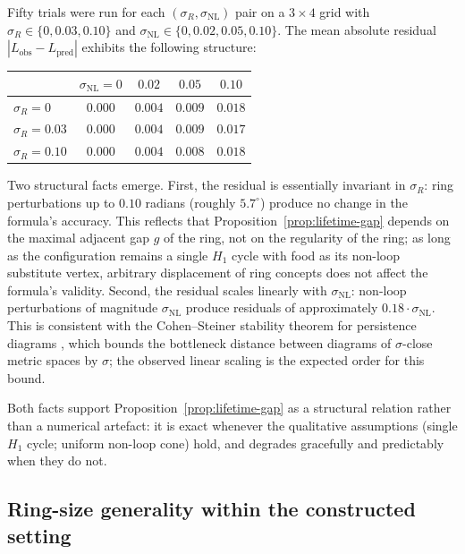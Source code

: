 \documentclass[12pt]{article}
\begin{document}
Fifty trials were run for each $(\sigma_R, \sigma_\mathrm{NL})$
pair on a $3 \times 4$ grid with $\sigma_R \in \{0, 0.03, 0.10\}$
and $\sigma_\mathrm{NL} \in \{0, 0.02, 0.05, 0.10\}$. The mean
absolute residual $|L_\mathrm{obs} - L_\mathrm{pred}|$ exhibits
the following structure:

\begin{center}
\begin{tabular}{l|cccc}
\hline
 & $\sigma_\mathrm{NL} = 0$ & $0.02$ & $0.05$ & $0.10$ \\
\hline
$\sigma_R = 0$    & $0.000$ & $0.004$ & $0.009$ & $0.018$ \\
$\sigma_R = 0.03$ & $0.000$ & $0.004$ & $0.009$ & $0.017$ \\
$\sigma_R = 0.10$ & $0.000$ & $0.004$ & $0.008$ & $0.018$ \\
\hline
\end{tabular}
\end{center}

Two structural facts emerge. First, the residual is essentially
invariant in $\sigma_R$: ring perturbations up to $0.10$ radians
(roughly $5.7^{\circ}$) produce no change in the formula's
accuracy. This reflects that
Proposition~\ref{prop:lifetime-gap} depends on the maximal adjacent
gap $g$ of the ring, not on the regularity of the ring; as long as
the configuration remains a single $H_1$ cycle with food as its
non-loop substitute vertex, arbitrary displacement of ring
concepts does not affect the formula's validity. Second, the
residual scales linearly with $\sigma_\mathrm{NL}$: non-loop
perturbations of magnitude $\sigma_\mathrm{NL}$ produce residuals
of approximately $0.18 \cdot \sigma_\mathrm{NL}$. This is consistent
with the Cohen--Steiner stability theorem for persistence diagrams
\cite{cohenSteiner2007}, which bounds the bottleneck distance
between diagrams of $\sigma$-close metric spaces by $\sigma$; the
observed linear scaling is the expected order for this bound.

Both facts support
Proposition~\ref{prop:lifetime-gap} as a structural relation rather
than a numerical artefact: it is exact whenever the qualitative
assumptions (single $H_1$ cycle; uniform non-loop cone) hold, and
degrades gracefully and predictably when they do not.

\subsection*{Ring-size generality within the constructed setting}
\end{document}
